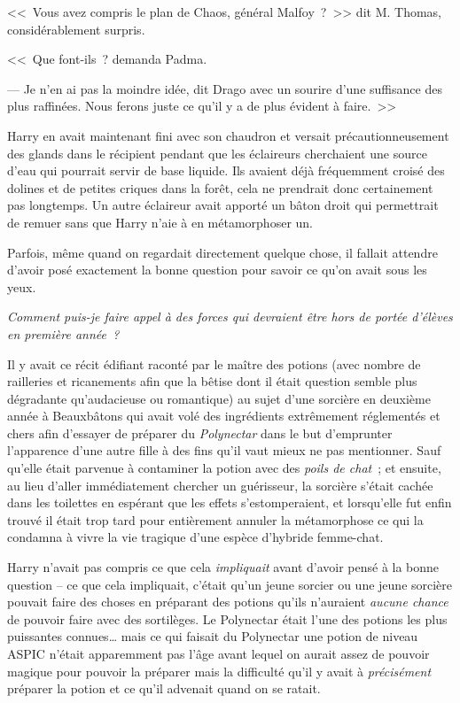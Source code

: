 <<~Vous avez compris le plan de Chaos, général Malfoy~?~>> dit M. Thomas, considérablement surpris.

<<~Que font-ils~? demanda Padma.

--- Je n'en ai pas la moindre idée, dit Drago avec un sourire d'une suffisance des plus raffinées. Nous ferons juste ce qu'il y a de plus évident à faire.~>>

\later

Harry en avait maintenant fini avec son chaudron et versait précautionneusement des glands dans le récipient pendant que les éclaireurs cherchaient une source d'eau qui pourrait servir de base liquide. Ils avaient déjà fréquemment croisé des dolines et de petites criques dans la forêt, cela ne prendrait donc certainement pas longtemps. Un autre éclaireur avait apporté un bâton droit qui permettrait de remuer sans que Harry n'aie à en métamorphoser un.

Parfois, même quand on regardait directement quelque chose, il fallait attendre d'avoir posé exactement la bonne question pour savoir ce qu'on avait sous les yeux.

\emph{Comment puis-je faire appel à des forces qui devraient être hors de portée d'élèves en première année~?}

Il y avait ce récit édifiant raconté par le maître des potions (avec nombre de railleries et ricanements afin que la bêtise dont il était question semble plus dégradante qu'audacieuse ou romantique) au sujet d'une sorcière en deuxième année à Beauxbâtons qui avait volé des ingrédients extrêmement réglementés et chers afin d'essayer de préparer du \emph{Polynectar} dans le but d'emprunter l'apparence d'une autre fille à des fins qu'il vaut mieux ne pas mentionner. Sauf qu'elle était parvenue à contaminer la potion avec des \emph{poils de chat}~; et ensuite, au lieu d'aller immédiatement chercher un guérisseur, la sorcière s'était cachée dans les toilettes en espérant que les effets s'estomperaient, et lorsqu'elle fut enfin trouvé il était trop tard pour entièrement annuler la métamorphose ce qui la condamna à vivre la vie tragique d'une espèce d'hybride femme-chat.

Harry n'avait pas compris ce que cela \emph{impliquait} avant d'avoir pensé à la bonne question -- ce que cela impliquait, c'était qu'un jeune sorcier ou une jeune sorcière pouvait faire des choses en préparant des potions qu'ils n'auraient \emph{aucune chance} de pouvoir faire avec des sortilèges. Le Polynectar était l'une des potions les plus puissantes connues… mais ce qui faisait du Polynectar une potion de niveau ASPIC n'était apparemment pas l'âge avant lequel on aurait assez de pouvoir magique pour pouvoir la préparer mais la difficulté qu'il y avait à \emph{précisément} préparer la potion et ce qu'il advenait quand on se ratait.

